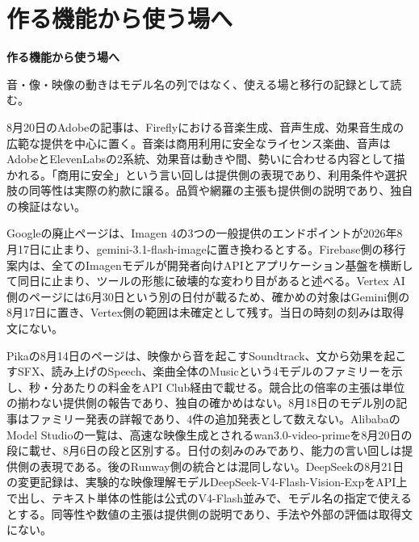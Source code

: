 \section{作る機能から使う場へ}
\begin{wideflow}
{\Large\bfseries 作る機能から使う場へ}\par
\smallskip
{\color{SurveyMuted}音・像・映像の動きはモデル名の列ではなく、使える場と移行の記録として読む。}\par
\end{wideflow}

\noindent 8月20日のAdobeの記事は、Fireflyにおける音楽生成、音声生成、効果音生成の広範な提供を中心に置く。音楽は商用利用に安全なライセンス楽曲、音声はAdobeとElevenLabsの2系統、効果音は動きや間、勢いに合わせる内容として描かれる。「商用に安全」という言い回しは提供側の表現であり、利用条件や選択肢の同等性は実際の約款に譲る。品質や網羅の主張も提供側の説明であり、独自の検証はない。 \cite{w2026w34w34eventc091}\par\medskip

\noindent Googleの廃止ページは、Imagen 4の3つの一般提供のエンドポイントが2026年8月17日に止まり、gemini-3.1-flash-imageに置き換わるとする。Firebase側の移行案内は、全てのImagenモデルが開発者向けAPIとアプリケーション基盤を横断して同日に止まり、ツールの形態に破壊的な変わり目があると述べる。Vertex AI側のページには6月30日という別の日付が載るため、確かめの対象はGemini側の8月17日に置き、Vertex側の範囲は未確定として残す。当日の時刻の刻みは取得文にない。 \cite{w2026w34w34eventc018}\par\medskip

\noindent Pikaの8月14日のページは、映像から音を起こすSoundtrack、文から効果を起こすSFX、読み上げのSpeech、楽曲全体のMusicという4モデルのファミリーを示し、秒・分あたりの料金をAPI Club経由で載せる。競合比の倍率の主張は単位の揃わない提供側の報告であり、独自の確かめはない。8月18日のモデル別の記事はファミリー発表の詳報であり、4件の追加発表として数えない。AlibabaのModel Studioの一覧は、高速な映像生成とされるwan3.0-video-primeを8月20日の段に載せ、8月6日の段と区別する。日付の刻みのみであり、能力の言い回しは提供側の表現である。後のRunway側の統合とは混同しない。DeepSeekの8月21日の変更記録は、実験的な映像理解モデルDeepSeek-V4-Flash-Vision-ExpをAPI上で出し、テキスト単体の性能は公式のV4-Flash並みで、モデル名の指定で使えるとする。同等性や数値の主張は提供側の説明であり、手法や外部の評価は取得文にない。 \cite{w2026w34w34eventc020,w2026w34w34eventgapalibabawan30modelstudio,w2026w34w34eventc022}\par\medskip

